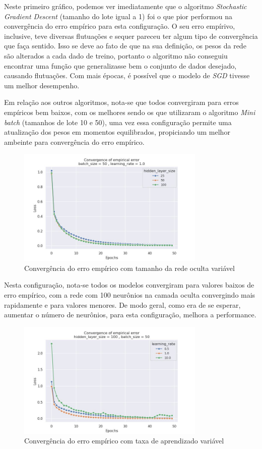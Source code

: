 \documentclass{article}
\begin{document}
Neste primeiro gráfico, podemos ver imediatamente que o algoritmo \textit{Stochastic Gradient Descent} (tamanho do lote igual a 1) foi o que pior performou na convergência do erro empírico
para esta configuração. O seu erro empírivo, inclusive, teve diversas flutuações e sequer pareceu ter algum tipo de convergência que faça sentido. Isso se deve ao fato de que na sua definição, os pesos
da rede são alterados a cada dado de treino, portanto o algoritmo não conseguiu encontrar uma função que generalizasse bem o conjunto de dados
desejado, causando flutuações. Com mais épocas, é possível que o modelo de \textit{SGD} tivesse um melhor desempenho. 

Em relação aos outros algoritmos, nota-se que todos convergiram para erros empíricos bem baixos, com os melhores sendo os que utilizaram o algoritmo \textit{Mini batch} (tamanhos de lote 10 e 50), uma vez
essa configuração permite uma atualização dos pesos em momentos equilibrados, propiciando um melhor ambeinte para convergência do erro empírico.

\begin{figure}[H]
{\centering
\includegraphics[width=0.8\textwidth]{images/empirical_error/hidden_layer_size_not_fixed.jpg}
\caption{Convergência do erro empírico com tamanho da rede oculta variável}}
\end{figure}

Nesta configuração, nota-se todos os modelos convergiram para valores baixos de erro empírico, com a rede com 100 neurônios na camada oculta convergindo
mais rapidamente e para valores menores. De modo geral, como era de se esperar, aumentar o número de neurônios, para esta configuração, melhora a performance.

\begin{figure}[H]
{\centering
\includegraphics[width=0.8\textwidth]{images/empirical_error/learning_rate_not_fixed.jpg}
\caption{Convergência do erro empírico com taxa de aprendizado variável}}
\end{figure}
\end{document}

